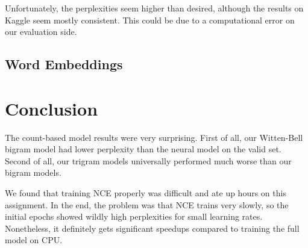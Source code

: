 \documentclass[11pt]{article}
\begin{document}
Unfortunately, the perplexities seem higher than desired, although the results on Kaggle seem mostly consistent. This could be due to a computational error on our evaluation side.

\subsection{Word Embeddings}


\section{Conclusion}

The count-based model results were very surprising. First of all, our Witten-Bell bigram model had lower perplexity than the neural model on the valid set. Second of all, our trigram models universally performed much worse than our bigram models. 

We found that training NCE properly was difficult and ate up hours on this assignment. In the end, the problem was that NCE trains very slowly, so the initial epochs showed wildly high perplexities for small learning rates. Nonetheless, it definitely gets significant speedups compared to training the full model on CPU. 


%
%
\end{document}
